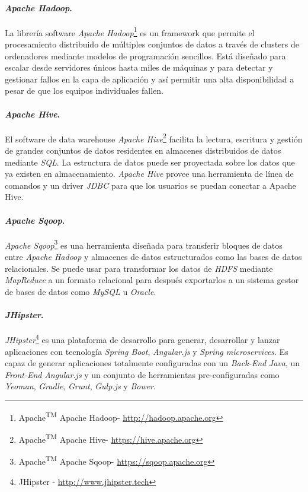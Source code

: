 \paragraph*{\textit{Apache Hadoop}.} La librería software \textit{Apache Hadoop}\footnote{Apache\textsuperscript{TM} Apache Hadoop\textregistered - \url{http://hadoop.apache.org}} es un framework que permite el procesamiento distribuido de múltiples conjuntos de datos a través de clusters de ordenadores mediante modelos de programación sencillos. Está diseñado para escalar desde servidores únicos hasta miles de máquinas y para detectar y gestionar fallos en la capa de aplicación y así permitir una alta disponibilidad a pesar de que los equipos individuales fallen. 
\paragraph*{\textit{Apache Hive}.} El software de data warehouse \textit{Apache Hive}\footnote{Apache\textsuperscript{TM} Apache Hive\textregistered - \url{https://hive.apache.org}} facilita la lectura, escritura y gestión de grandes conjuntos de datos residentes en almacenes distribuidos de datos mediante \textit{SQL}. La estructura de datos puede ser proyectada sobre los datos que ya existen en almacenamiento. \textit{Apache Hive} provee una herramienta de línea de comandos y un driver \textit{JDBC} para que los usuarios se puedan conectar a Apache Hive. 
\paragraph*{ \textit{Apache Sqoop}.} \textit{Apache Sqoop}\footnote{Apache\textsuperscript{TM} Apache Sqoop\textregistered - \url{https://sqoop.apache.org}} es una herramienta diseñada para transferir bloques de datos entre \textit{Apache Hadoop} y almacenes de datos estructurados como las bases de datos relacionales. Se puede usar para transformar los datos de \textit{HDFS} mediante \textit{MapReduce} a un formato relacional para después exportarlos a un sistema gestor de bases de datos como \textit{MySQL} u \textit{Oracle}. 
\paragraph*{\textit{JHipster}.} \textit{JHipster}\footnote{JHipster - \url{http://www.jhipster.tech}} es una plataforma de desarrollo para generar, desarrollar y lanzar aplicaciones con tecnología \textit{Spring Boot}, \textit{Angular.js} y \textit{Spring microservices}. Es capaz de generar aplicaciones totalmente configuradas con un \textit{Back-End} \textit{Java}, un \textit{Front-End} \textit{Angular.js} y un conjunto de herramientas pre-configuradas como \textit{Yeoman}, \textit{Gradle}, \textit{Grunt}, \textit{Gulp.js} y \textit{Bower}.
